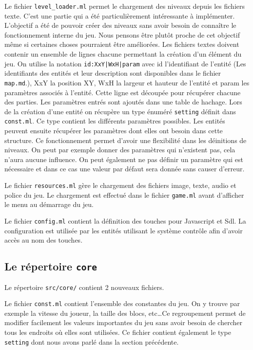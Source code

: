 \documentclass{article}
\begin{document}
Le fichier \verb|level_loader.ml| permet le chargement 
des niveaux depuis les fichiers texte. C'est une partie qui a été particulièrement intéressante à implémenter. 
L'objectif a été de pouvoir créer des niveaux sans avoir besoin de connaître le fonctionnement interne du jeu. 
Nous pensons être plutôt proche de cet objectif même si certaines choses pourraient être améliorées. Les fichiers
 textes doivent contenir un ensemble de lignes 
chacune permettant la création d'un élément du jeu. On utilise la notation \texttt{id:XxY|WxH|param} avec id 
l'identifiant de l'entité (Les identifiants des entités et leur description sont disponibles dans le fichier
 \texttt{map.md}.), XxY la position XY, WxH la largeur et hauteur de l'entité et param les paramètres 
associés à l'entité. Cette ligne est découpée pour récupérer chacune des parties. Les paramètres entrés sont 
ajoutés dans une table de hachage. Lors de la création d'une entité on récupère un type énuméré \verb|setting|
définit dans \verb|const.ml|. Ce type contient les différents paramètres possibles. Les entités peuvent ensuite
récupérer les paramètres dont elles ont besoin dans cette structure. Ce fonctionnement permet d'avoir une 
flexibilité dans les déinitions de niveaux. On peut par exemple donner des paramètres qui n'existent pas, cela 
n'aura aucune influence. On peut également ne pas définir un paramètre qui est nécessaire et dans ce cas une 
valeur par défaut sera donnée sans causer d'erreur. 

Le fichier \verb|resources.ml| gère le chargement des fichiers image, texte, audio et police du jeu. Le chargement 
est effectué dans le fichier \verb|game.ml| avant d'afficher le menu au démarrage du jeu.

Le fichier \verb|config.ml| contient la définition des touches pour Javascript et Sdl. La configuration est utilisée 
par les entités utilisant le système contrôle afin d'avoir accès au nom des touches.

\subsection{Le répertoire \texttt{core}}
Le répertoire \verb|src/core/| contient 2 nouveaux fichiers.

Le fichier \verb|const.ml| contient l'ensemble des constantes du jeu. On y trouve par exemple la vitesse du joueur,
la taille des blocs, etc\dots Ce regroupement permet de modifier facilement les valeurs importantes du jeu sans 
avoir besoin de chercher tous les endroits où elles sont utilisées. Ce fichier contient également le type \verb|setting| 
dont nous avons parlé dans la section précédente.
\end{document}
